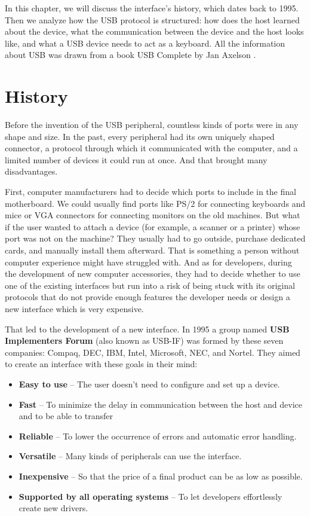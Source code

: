 In this chapter, we will discuss the interface's history, which dates back to 1995. Then we analyze how the USB protocol is structured: how does the host learned about the device, what the communication between the device and the host looks like, and what a USB device needs to act as a keyboard. All the information about USB was drawn from a book USB Complete by Jan Axelson \cite{USBComplete}.

\section{History}
\label{sec:history}
Before the invention of the USB peripheral, countless kinds of ports were in any shape and size. In the past, every peripheral had its own uniquely shaped connector, a protocol through which it communicated with the computer, and a limited number of devices it could run at once. And that brought many disadvantages.

First, computer manufacturers had to decide which ports to include in the final motherboard. We could usually find ports like PS/2 for connecting keyboards and mice or VGA connectors for connecting monitors on the old machines. But what if the user wanted to attach a device (for example, a scanner or a printer) whose port was not on the machine? They usually had to go outside, purchase dedicated cards, and manually install them afterward. That is something a person without computer experience might have struggled with. And as for developers, during the development of new computer accessories, they had to decide whether to use one of the existing interfaces but run into a risk of being stuck with its original protocols that do not provide enough features the developer needs or design a new interface which is very expensive.

That led to the development of a new interface. In 1995 a group named \textbf{USB Implementers Forum} (also known as USB-IF) was formed by these seven companies: Compaq, DEC, IBM, Intel, Microsoft, NEC, and Nortel. They aimed to create an interface with these goals in their mind:
\begin{itemize}
    \item \textbf{Easy to use} \--- The user doesn't need to configure and set up a device.
    \item \textbf{Fast} \--- To minimize the delay in communication between the host and device and to be able to transfer
    \item \textbf{Reliable} \--- To lower the occurrence of errors and automatic error handling.
    \item \textbf{Versatile} \--- Many kinds of peripherals can use the interface.
    \item \textbf{Inexpensive} \--- So that the price of a final product can be as low as possible.
    \item \textbf{Supported by all operating systems} \--- To let developers effortlessly create new drivers.
\end{itemize}

